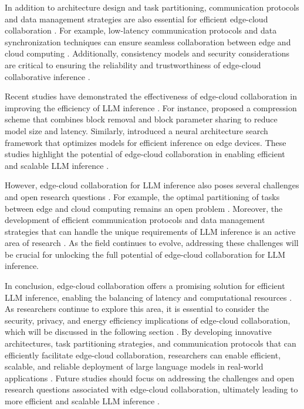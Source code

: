 \documentclass[11pt,a4paper]{article}
\begin{document}
In addition to architecture design and task partitioning, communication protocols and data management strategies are also essential for efficient edge-cloud collaboration \cite{arxiv:2404.04793}. For example, low-latency communication protocols and data synchronization techniques can ensure seamless collaboration between edge and cloud computing \cite{arxiv:2501.19392}. Additionally, consistency models and security considerations are critical to ensuring the reliability and trustworthiness of edge-cloud collaborative inference \cite{doi:10.1609/aaai.v37i9.26255}.

Recent studies have demonstrated the effectiveness of edge-cloud collaboration in improving the efficiency of LLM inference \cite{arxiv:2406.05955}. For instance, \cite{arxiv:2407.00928} proposed a compression scheme that combines block removal and block parameter sharing to reduce model size and latency. Similarly, \cite{arxiv:2405.18377} introduced a neural architecture search framework that optimizes models for efficient inference on edge devices. These studies highlight the potential of edge-cloud collaboration in enabling efficient and scalable LLM inference \cite{arxiv:2411.19146}.

However, edge-cloud collaboration for LLM inference also poses several challenges and open research questions \cite{arxiv:2408.03130}. For example, the optimal partitioning of tasks between edge and cloud computing remains an open problem \cite{arxiv:2410.08661}. Moreover, the development of efficient communication protocols and data management strategies that can handle the unique requirements of LLM inference is an active area of research \cite{arxiv:2506.07533}. As the field continues to evolve, addressing these challenges will be crucial for unlocking the full potential of edge-cloud collaboration for LLM inference.

In conclusion, edge-cloud collaboration offers a promising solution for efficient LLM inference, enabling the balancing of latency and computational resources \cite{arxiv:2505.03031}. As researchers continue to explore this area, it is essential to consider the security, privacy, and energy efficiency implications of edge-cloud collaboration, which will be discussed in the following section \cite{arxiv:2502.11880}. By developing innovative architectures, task partitioning strategies, and communication protocols that can efficiently facilitate edge-cloud collaboration, researchers can enable efficient, scalable, and reliable deployment of large language models in real-world applications \cite{arxiv:2506.10205}. Future studies should focus on addressing the challenges and open research questions associated with edge-cloud collaboration, ultimately leading to more efficient and scalable LLM inference \cite{arxiv:2406.13868}.
\end{document}
